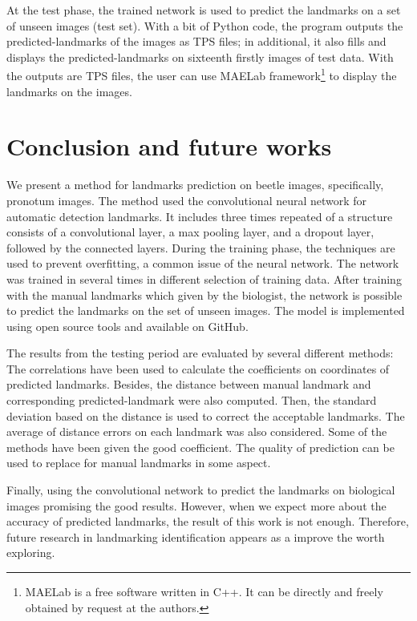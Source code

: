 \documentclass[conference]{IEEEtran}
\begin{document}
At the test phase, the trained network is used to predict the landmarks on a set of unseen images (test set). With a bit of Python code, the program outputs the predicted-landmarks of the images as TPS files; in additional, it also fills and displays the predicted-landmarks on sixteenth firstly images of test data. With the outputs are TPS files, the user can use MAELab\cite{le2017maelab} framework\footnote{MAELab is a free software written in C++. It can be directly
and freely obtained by request at the authors.} to display the landmarks on the images.
\section{Conclusion and future works}
We present a method for landmarks prediction on beetle images, specifically, pronotum images. The method used the convolutional neural network for automatic detection landmarks. It includes three times repeated of a structure consists of a convolutional layer, a max pooling layer, and a dropout layer, followed by the connected layers. During the training phase, the techniques are used to prevent overfitting, a common issue of the neural network. The network was trained in several times in different selection of training data. After training with the manual landmarks which given by the biologist, the network is possible to predict the landmarks on the set of unseen images. The model is implemented using open source tools and available on GitHub.

The results from the testing period are evaluated by several different methods: The correlations have been used to calculate the coefficients on coordinates of predicted landmarks. Besides, the distance between manual landmark and corresponding predicted-landmark were also computed. Then, the standard deviation based on the distance is used to correct the acceptable landmarks. The average of distance errors on each landmark was also considered. Some of the methods have been given the good coefficient. The quality of prediction can be used to replace for manual landmarks in some aspect.

Finally, using the convolutional network to predict the landmarks on biological images promising the good results. However, when we expect more about the accuracy of predicted landmarks, the result of this work is not enough. Therefore, future research in landmarking identification appears as a improve the worth exploring.
\end{document}
